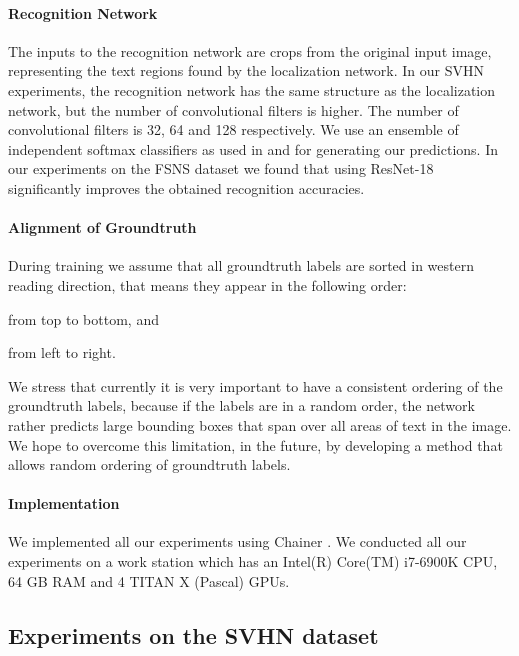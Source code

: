\documentclass[letterpaper]{article}
\begin{document}
	\paragraph{Recognition Network}
	The inputs to the recognition network are  crops from the original input image, representing the text regions found by the localization network.
	In our SVHN experiments, the recognition network has the same structure as the localization network, but the number of convolutional filters is higher.
	The number of convolutional filters is 32, 64 and 128 respectively.
	We use an ensemble of  independent softmax classifiers as used in \cite{Goodfellow2014MultiDigit} and \cite{Jaderberg2014Deep} for generating our predictions.
	In our experiments on the FSNS dataset we found that using ResNet-18~\cite{He2016Deep} significantly improves the obtained recognition accuracies.

	\paragraph{Alignment of Groundtruth}
	During training we assume that all groundtruth labels are sorted in western reading direction, that means they appear in the following order:
	\begin{enumerate*}[label={\arabic*.}]
		\item from top to bottom, and
		\item from left to right.
	\end{enumerate*}
	We stress that currently it is very important to have a consistent ordering of the groundtruth labels, because if the labels are in a random order, the network rather predicts large bounding boxes that span over all areas of text in the image.
	We hope to overcome this limitation, in the future, by developing a method that allows random ordering of groundtruth labels.

	\paragraph{Implementation}
	We implemented all our experiments using Chainer \cite{chainer_learningsys2015}. We conducted all our experiments on a work station which has an Intel(R) Core(TM) i7-6900K CPU, 64 GB RAM and 4 TITAN X (Pascal) GPUs.

	\subsection{Experiments on the SVHN dataset}
	\label{ssec:svhn_experiments}
\end{document}
